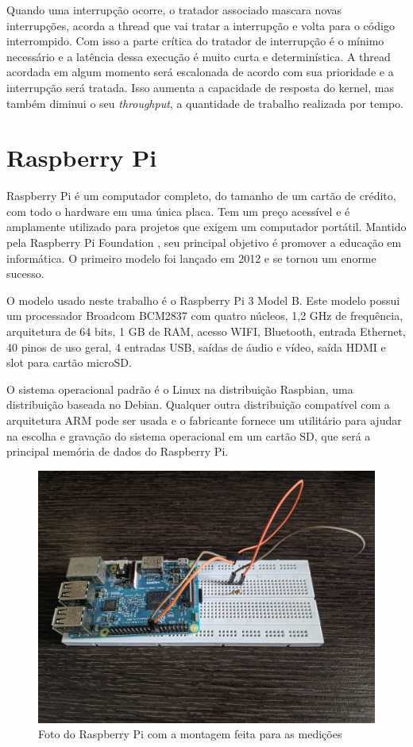 Quando uma interrupção ocorre, o tratador associado mascara novas interrupções, acorda a thread que vai tratar a interrupção e volta para o código interrompido. Com isso a parte crítica do tratador de interrupção é o mínimo necessário e a latência dessa execução é muito curta e determinística. A thread acordada em algum momento será escalonada de acordo com sua prioridade e a interrupção será tratada. Isso aumenta a capacidade de resposta do kernel, mas também diminui o seu \textit{throughput}, a quantidade de trabalho realizada por tempo.

\section{Raspberry Pi}

Raspberry Pi é um computador completo, do tamanho de um cartão de crédito, com todo o hardware em uma única placa. Tem um preço acessível e é amplamente utilizado para projetos que exigem um computador portátil. Mantido pela Raspberry Pi Foundation \cite{RPF2019}, seu principal objetivo é promover a educação em informática. O primeiro modelo foi lançado em 2012 e se tornou um enorme sucesso.

O modelo usado neste trabalho é o Raspberry Pi 3 Model B. Este modelo possui um processador Broadcom BCM2837 com quatro núcleos, 1,2 GHz de frequência, arquitetura de 64 bits, 1 GB de RAM, acesso WIFI, Bluetooth, entrada Ethernet, 40 pinos de uso geral, 4 entradas USB, saídas de áudio e vídeo, saída HDMI e slot para cartão microSD.

O sistema operacional padrão é o Linux na distribuição Raspbian, uma distribuição baseada no Debian. Qualquer outra distribuição compatível com a arquitetura ARM pode ser usada e o fabricante fornece um utilitário para ajudar na escolha e gravação do sistema operacional em um cartão SD, que será a principal memória de dados do Raspberry Pi.

\begin{figure}[!htb]
    \centering
    \includegraphics[width=.8\textwidth]{photos/raspberry-photo.jpg}
    \caption{Foto do Raspberry Pi com a montagem feita para as medições}
    \label{foto:Raspberry Pi}
\end{figure}

